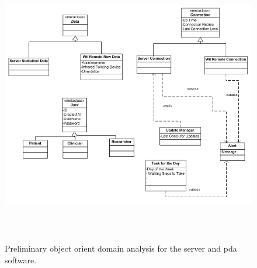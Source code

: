 \documentclass{article}
\begin{document}
\begin{figure}[ht]
\includegraphics[width=6in,height=4.82in]{objstuff.png}
\caption{Preliminary object orient domain analysis for the server and pda software.}
\label{fig: prelim ooda}
\end{figure}
\end{document}
